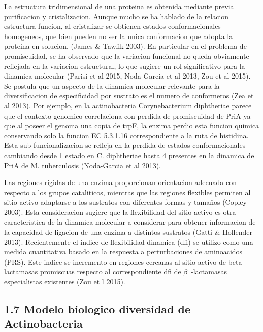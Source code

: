 \documentclass[12pt,twoside]{reedthesis}
\begin{document}
  La estructura tridimensional de una proteina es obtenida mediante previa
  purificacion y cristalizacion. Aunque mucho se ha hablado de la relacion
  estructura funcion, al cristalizar se obtienen estados conformacionales
  homogeneos, que bien pueden no ser la unica conformacion que adopta la
  proteina en solucion. (James \& Tawfik 2003). En particular en el
  problema de promiscuidad, se ha observado que la variacion funcional no
  queda obviamente reflejada en la variacion estructural, lo que sugiere
  un rol significativo para la dinamica molecular (Parisi et al 2015,
  Noda-Garcia et al 2013, Zou et al 2015). Se postula que un aspecto de la
  dinamica molecular relevante para la diversificacion de especificidad
  por sustrato es el numero de conformeros (Zea et al 2013). Por ejemplo,
  en la actinobacteria Corynebacterium diphtheriae parece que el contexto
  genomico correlaciona con perdida de promiscuidad de PriA ya que al
  poseer el genoma una copia de trpF, la enzima perdio esta funcion
  quimica conservando solo la funcion EC 5.3.1.16 correspondiente a la
  ruta de histidina. Esta sub-funcionalizacion se refleja en la perdida de
  estados conformacionales cambiando desde 1 estado en C. diphtheriae
  hasta 4 presentes en la dinamica de PriA de M. tuberculosis (Noda-Garcia
  et al 2013).
  
  Las regiones rigidas de una enzima proporcionan orientacion adecuada con
  respecto a los grupos cataliticos, mientras que las regiones flexibles
  permiten al sitio activo adaptarse a los sustratos con diferentes formas
  y tamaños (Copley 2003). Esta consideracion sugiere que la flexibilidad
  del sitio activo es otra caracteristica de la dinamica molecular a
  considerar para obtener informacion de la capacidad de ligacion de una
  enzima a distintos sustratos (Gatti \& Hollender 2013). Recientemente el
  indice de flexibilidad dinamica (dfi) se utilizo como una medida
  cuantitativa basado en la respuesta a perturbaciones de aminoacidos
  (PRS). Este indice se incremento en regiones cercanas al sitio activo de
  beta lactamasas promiscuas respecto al correspondiente dfi de
  \(\noindent\beta\) -lactamasas especialistas existentes (Zou et l 2015).
  
  \subsection{1.7 Modelo biologico diversidad de
  Actinobacteria}\label{modelo-biologico-diversidad-de-actinobacteria}
  
\end{document}
